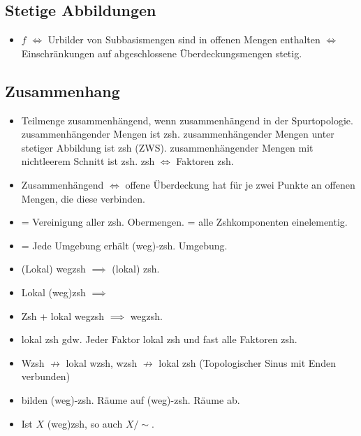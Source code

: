 \documentclass[8pt]{extarticle}
\begin{document}
\subsection*{Stetige Abbildungen}
\begin{itemize}
	\item $f$  $\Leftrightarrow$ Urbilder von Subbasismengen sind in offenen Mengen enthalten $\Leftrightarrow$ Einschränkungen auf abgeschlossene Überdeckungsmengen stetig.
\end{itemize}
\subsection*{Zusammenhang}
\begin{itemize}
	\item Teilmenge zusammenhängend, wenn zusammenhängend in der Spurtopologie.  zusammenhängender Mengen ist zsh.  zusammenhängender Mengen unter stetiger Abbildung ist zsh (ZWS).  zusammenhängender Mengen mit nichtleerem Schnitt ist zsh.  zsh $\Leftrightarrow$ Faktoren zsh.
	\item Zusammenhängend $\Leftrightarrow$ offene Überdeckung hat für je zwei Punkte  an offenen Mengen, die diese verbinden. 
	\item {} = Vereinigung aller zsh. Obermengen.  = alle Zshkomponenten einelementig.
	\item 
	 = Jede Umgebung erhält (weg)-zsh. Umgebung. 
	\item (Lokal) wegzsh $\implies$ (lokal) zsh. 
	\item Lokal (weg)zsh $\implies$ 
	\item Zsh + lokal wegzsh $\implies$ wegzsh.
	\item {} lokal zsh gdw. Jeder Faktor lokal zsh und fast alle Faktoren zsh.
	\item Wzsh $\not \rightarrow$ lokal wzsh, wzsh $\not \rightarrow$ lokal zsh (Topologischer Sinus mit Enden verbunden)
	\item {} bilden (weg)-zsh. Räume auf (weg)-zsh. Räume ab.
	\item Ist $X$ (weg)zsh, so auch $X/\sim$.
\end{itemize}
\end{document}
